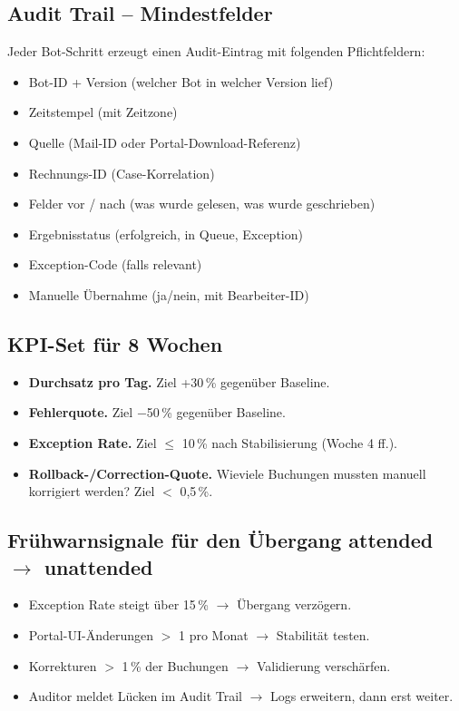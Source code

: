 \documentclass[11pt,a4paper,oneside]{article}
\begin{document}
\subsection{Audit Trail -- Mindestfelder}

Jeder Bot-Schritt erzeugt einen Audit-Eintrag mit folgenden Pflichtfeldern:

\begin{itemize}
  \item Bot-ID + Version (welcher Bot in welcher Version lief)
  \item Zeitstempel (mit Zeitzone)
  \item Quelle (Mail-ID oder Portal-Download-Referenz)
  \item Rechnungs-ID (Case-Korrelation)
  \item Felder vor / nach (was wurde gelesen, was wurde geschrieben)
  \item Ergebnisstatus (erfolgreich, in Queue, Exception)
  \item Exception-Code (falls relevant)
  \item Manuelle Übernahme (ja/nein, mit Bearbeiter-ID)
\end{itemize}

\subsection{KPI-Set für 8 Wochen}

\begin{itemize}
  \item \textbf{Durchsatz pro Tag.} Ziel +30\,\% gegenüber Baseline.
  \item \textbf{Fehlerquote.} Ziel $-$50\,\% gegenüber Baseline.
  \item \textbf{Exception Rate.} Ziel $\leq$ 10\,\% nach Stabilisierung (Woche 4 ff.).
  \item \textbf{Rollback-/Correction-Quote.} Wieviele Buchungen mussten manuell korrigiert werden? Ziel $<$ 0,5\,\%.
\end{itemize}

\subsection{Frühwarnsignale für den Übergang attended $\to$ unattended}

\begin{itemize}
  \item Exception Rate steigt über 15\,\% $\to$ Übergang verzögern.
  \item Portal-UI-Änderungen $>$ 1 pro Monat $\to$ Stabilität testen.
  \item Korrekturen $>$ 1\,\% der Buchungen $\to$ Validierung verschärfen.
  \item Auditor meldet Lücken im Audit Trail $\to$ Logs erweitern, dann erst weiter.
\end{itemize}
\end{document}
